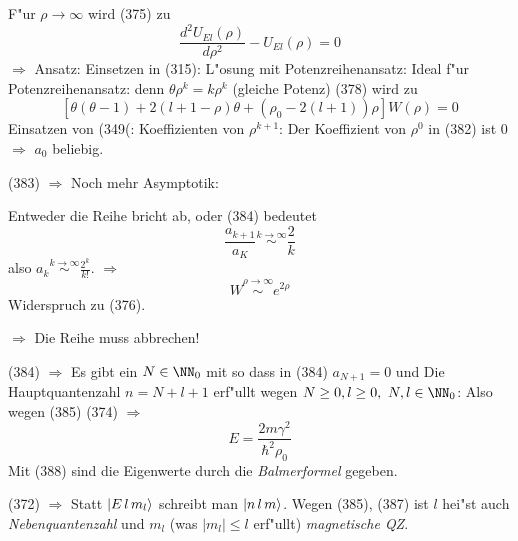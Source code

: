 \documentclass[a4paper]{scrartcl}
\begin{document}
{F"ur $\rho \rightarrow \infty$ wird (375) zu 
$$\frac{d^2 U_{E l}(\rho)}{d \rho^2} - U_{El}(\rho) = 0$$
$\Longrightarrow$
Ansatz: 
Einsetzen in (315):
L"osung mit Potenzreihenansatz:
Ideal f"ur Potenzreihenansatz:
denn $\theta \rho^k = k \rho^k$ (gleiche Potenz)
(378) wird zu
$$\left[ \theta (\theta-1) + 2(l +1 - \rho) \theta + (\rho_0 - 2(l+1)) \rho \right] W(\rho) = 0$$
Einsatzen von (349(:
Koeffizienten von $\rho^{k+1}$:
Der Koeffizient von $\rho^0$ in (382) ist $0$ $\Longrightarrow$ $a_0$  beliebig.

(383) $\Longrightarrow$
Noch mehr Asymptotik:

Entweder die Reihe bricht ab, oder (384) bedeutet
$$\frac{ a_{k+1}}{a_K} \stackrel{k \rightarrow \infty}\sim \frac 2k$$
also $a_k \stackrel{k \rightarrow \infty}\sim \frac{2^k}{k!}$. $\Longrightarrow$
$$W \stackrel{\rho \rightarrow \infty}\sim e^{2 \rho}$$
Widerspruch zu (376).

$\Longrightarrow$ Die Reihe muss abbrechen!

(384) $\Longrightarrow$ Es gibt ein $N \in \NN_0$ mit
so dass in (384) $a_{N+1} = 0$ und 
Die Hauptquantenzahl $n = N+l+1$ erf"ullt wegen $N \geq 0, l \geq 0, \ N, l \in \NN_0$:
Also wegen (385) 
(374) $\Longrightarrow$
$$E = \frac{2 m \gamma^2}{\hbar^2 \rho_0}$$
Mit (388) sind die Eigenwerte durch die \emph{Balmerformel}
gegeben.

(372) $\Longrightarrow$ 
Statt $\Ket{ E \, l \, m_l}$ schreibt man $\Ket{ n \, l \, m}$. Wegen (385), (387) ist
$l$ hei"st auch \emph{Nebenquantenzahl} und $m_l$ (was $\vert m_l \vert \leq l$ erf"ullt) \emph{magnetische QZ}.

}
\end{document}
